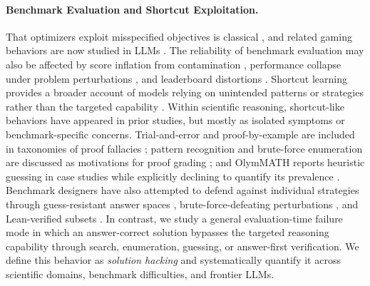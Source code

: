 \paragraph{Benchmark Evaluation and Shortcut Exploitation.}
That optimizers exploit misspecified objectives is classical \citep{krakovna2020specification,skalse2022defining,gao2023scaling}, and related gaming behaviors are now studied in LLMs \citep{denison2024sycophancy,baker2025monitoring}. The reliability of benchmark evaluation may also be affected by score inflation from contamination \citep{zhou2023dont,zhang2024careful}, performance collapse under problem perturbations \citep{mirzadeh2025gsm,huang2025mathperturb}, and leaderboard distortions \citep{singh2025leaderboard}. Shortcut learning provides a broader account of models relying on unintended patterns or strategies rather than the targeted capability \citep{geirhos2020shortcut}. Within scientific reasoning, shortcut-like behaviors have appeared in prior studies, but mostly as isolated symptoms or benchmark-specific concerns. Trial-and-error and proof-by-example are included in taxonomies of proof fallacies \citep{mahdavi2025brains}; pattern recognition and brute-force enumeration are discussed as motivations for proof grading \citep{balunovic2025matharena}; and OlymMATH reports heuristic guessing in case studies while explicitly declining to quantify its prevalence \citep{sun2025challenging}. Benchmark designers have also attempted to defend against individual strategies through guess-resistant answer spaces \citep{glazer2024frontiermath}, brute-force-defeating perturbations \citep{huang2025mathperturb}, and Lean-verified subsets \citep{sun2025challenging}. In contrast, we study a general evaluation-time failure mode in which an answer-correct solution bypasses the targeted reasoning capability through search, enumeration, guessing, or answer-first verification. We define this behavior as \emph{solution hacking} and systematically quantify it across scientific domains, benchmark difficulties, and frontier LLMs.

